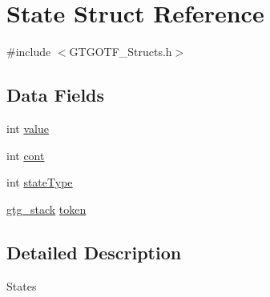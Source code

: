 \hypertarget{structState}{\section{State Struct Reference}
\label{structState}
}


{\ttfamily \#include $<$G\-T\-G\-O\-T\-F\-\_\-\-Structs.\-h$>$}

\subsection*{Data Fields}
\begin{DoxyCompactItemize}
\item 
int \hyperlink{structState_ad005ebc45314033c4b897401ee150d13}{value}
\item 
int \hyperlink{structState_a59ce5ace1f042871476d027578373a10}{cont}
\item 
int \hyperlink{structState_a815c7d082e4ffdd1a5cb6be3bdea0742}{state\-Type}
\item 
\hyperlink{GTGStack_8h_a4b7833a97e238a050cf5fd9731c74ab0}{gtg\-\_\-stack} \hyperlink{structState_ac8fa30ee49b7ea41e7abafea82dead9b}{token}
\end{DoxyCompactItemize}


\subsection{Detailed Description}
States 

